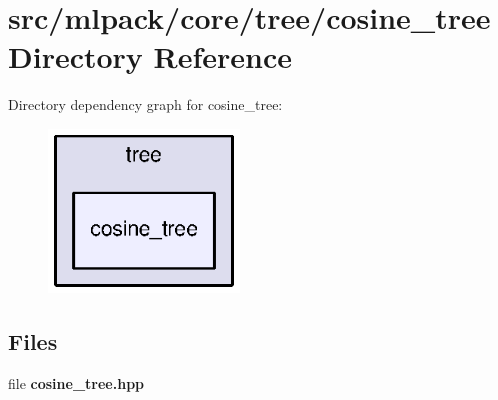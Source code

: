 \section{src/mlpack/core/tree/cosine\+\_\+tree Directory Reference}
\label{dir_47f18cd886ddfd9fe2e9eded46d048f4}
Directory dependency graph for cosine\+\_\+tree\+:
\nopagebreak
\begin{figure}[H]
\begin{center}
\leavevmode
\includegraphics[width=144pt]{dir_47f18cd886ddfd9fe2e9eded46d048f4_dep}
\end{center}
\end{figure}
\subsection*{Files}
\begin{DoxyCompactItemize}
\item 
file {\bf cosine\+\_\+tree.\+hpp}
\end{DoxyCompactItemize}
